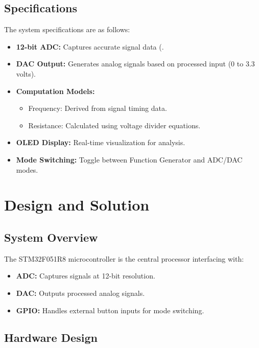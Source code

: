 \documentclass[12pt]{article}
\begin{document}
\subsection{Specifications}
The system specifications are as follows:
\begin{itemize}[leftmargin=2em]
    \item \textbf{12-bit ADC:} Captures accurate signal data (.
    \item \textbf{DAC Output:} Generates analog signals based on processed input (0 to 3.3 volts).
    \item \textbf{Computation Models:} 
    \begin{itemize}
        \item Frequency: Derived from signal timing data.
        \item Resistance: Calculated using voltage divider equations.
    \end{itemize}
    \item \textbf{OLED Display:} Real-time visualization for analysis.
    \item \textbf{Mode Switching:} Toggle between Function Generator and ADC/DAC modes.
\end{itemize}

\newpage

\section{Design and Solution}
\subsection{System Overview}
The STM32F051R8 microcontroller is the central processor interfacing with:
\begin{itemize}[leftmargin=2em]
    \item \textbf{ADC:} Captures signals at 12-bit resolution.
    \item \textbf{DAC:} Outputs processed analog signals.
    \item \textbf{GPIO:} Handles external button inputs for mode switching.
\end{itemize}

\subsection{Hardware Design}
\end{document}
